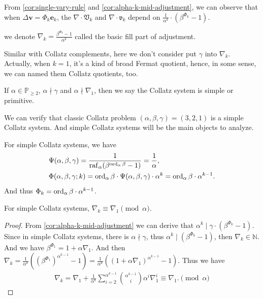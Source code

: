 From \cref{cor:single-vary-rule} and \cref{cor:alpha-k-mid-adjustment}, we can observe that when $\Delta\bm{v} = \Phi_k\bm{e}_k$, the $\nabla\cdot\mathfrak{V}_{k}$ and $\nabla\cdot\mathfrak{v}_{k}$ depend on $\frac{1}{\alpha^{k}}\cdot(\beta^{\Phi_k} - 1)$.
\begin{definition}\label{def:basic-fill-part-of-adjustment}
we denote $\nabla_{k} = \frac{\beta^{\Phi_k} - 1}{\alpha^{k}}$ called the basic fill part of adjustment.
\end{definition}
Similar with Collatz complements, here we don't consider put $\gamma$ into $\nabla_{k}$. Actually, when $k = 1$, it's a kind of broad Fermat quotient, hence, in some sense, we can named them Collatz quotients, too.
\begin{definition}
If $\alpha\in\mathbb{P}_{\ge 2}$, $\alpha\nmid\gamma$ and $\alpha\nmid \nabla_{1}$, then we say the Collatz system is simple or primitive.
\end{definition}
We can verify that classic Collatz problem $(\alpha, \beta, \gamma) = (3,2,1)$ is a simple Collatz system. And simple Collatz systems will be the main objects to analyze.
\begin{proposition}
    For simple Collatz systems, we have \begin{align*}
        &\Psi(\alpha, \beta, \gamma) = \frac{1}{\operatorname{raf}_{\alpha}(\beta^{\operatorname{ord}_{\alpha}\beta} - 1)} = \frac{1}{\alpha}, \\
        &\Phi(\alpha, \beta, \gamma; k) = \operatorname{ord}_{\alpha}\beta\cdot\Psi(\alpha, \beta, \gamma)\cdot\alpha^{k} = \operatorname{ord}_{\alpha}\beta\cdot\alpha^{k-1}.
    \end{align*}
    And thus $\Phi_k = \operatorname{ord}_{\alpha}\beta\cdot\alpha^{k-1}$.
\end{proposition}
\begin{proposition}\label{prop:nabla-are-equivalent-modulo-alpha}
    For simple Collatz systems, $\nabla_{k} \equiv \nabla_{1} \pmod{\alpha}$.
\end{proposition}
\begin{proof}
    From \cref{cor:alpha-k-mid-adjustment} we can derive that $\alpha^{k} \mid \gamma\cdot (\beta^{\Phi_k} - 1)$. Since in simple Collatz systems, there is $\alpha \nmid \gamma$, thus $\alpha^{k} \mid (\beta^{\Phi_k} - 1)$, then $\nabla_{k} \in \mathbb{N}$. And we have $\beta^{\Phi_1} = 1 + \alpha\nabla_{1}$. And then $\nabla_{k} = \frac{1}{\alpha^{k}}((\beta^{\Phi_1})^{\alpha^{k-1}} - 1) = \frac{1}{\alpha^{k}}((1 + \alpha\nabla_1)^{\alpha^{k-1}} - 1)$. Thus we have
    \begin{align*}
        \nabla_{k} = \nabla_1 + \frac{1}{\alpha^{k}}\sum_{i=2}^{\alpha^{k-1}}\binom{\alpha^{k-1}}{i} \alpha^{i}\nabla_1^{i} \equiv \nabla_1. \pmod{\alpha}
    \end{align*}
\end{proof}
